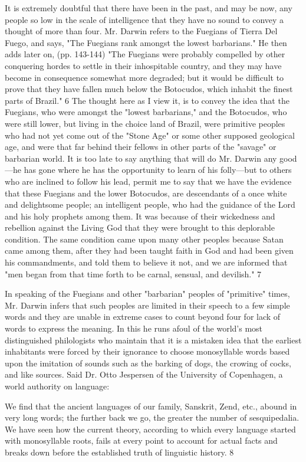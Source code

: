 It is extremely doubtful that there have been in the past, and may be now, any people so low
in the scale of intelligence that they have no sound to convey a thought of more than four.
Mr. Darwin refers to the Fuegians of Tierra Del Fuego, and says, "The Fuegians rank
amongst the lowest barbarians." He then adds later on, (pp. 143-144) "The Fuegians were
probably compelled by other conquering hordes to settle in their inhospitable country, and
they may have become in consequence somewhat more degraded; but it would be difficult to
prove that they have fallen much below the Botocudos, which inhabit the finest parts of
Brazil." 6 The thought here as I view it, is to convey the idea that the Fuegians, who were
amongst the "lowest barbarians," and the Botocudos, who were still lower, but living in the
choice land of Brazil, were primitive peoples who had not yet come out of the "Stone Age"
or some other supposed geological age, and were that far behind their fellows in other parts
of the "savage" or barbarian world. It is too late to say anything that will do Mr. Darwin any
good—he has gone where he has the opportunity to learn of his folly—but to others who are
inclined to follow his lead, permit me to say that we have the evidence that these Fuegians
and the lower Botocudos, are descendants of a once white and delightsome people; an
intelligent people, who had the guidance of the Lord and his holy prophets among them. It
was because of their wickedness and rebellion against the Living God that they were brought
to this deplorable condition. The same condition came upon many other peoples because
Satan came among them, after they had been taught faith in God and had been given his
commandments, and told them to believe it not, and we are informed that "men began from
that time forth to be carnal, sensual, and devilish." 7

In speaking of the Fuegians and other "barbarian" peoples of "primitive" times, Mr. Darwin
infers that such peoples are limited in their speech to a few simple words and they are unable
in extreme cases to count beyond four for lack of words to express the meaning. In this he
runs afoul of the world's most distinguished philologists who maintain that it is a mistaken
idea that the earliest inhabitants were forced by their ignorance to choose monosyllable
words based upon the imitation of sounds such as the barking of dogs, the crowing of cocks,
and like sources. Said Dr. Otto Jespersen of the University of Copenhagen, a world authority
on language:

We find that the ancient languages of our family, Sanskrit, Zend, etc., abound in very long
words; the further back we go, the greater the number of sesquipedalia. We have seen how
the current theory, according to which every language started with monosyllable roots, fails
at every point to account for actual facts and breaks down before the established truth of
linguistic history. 8

